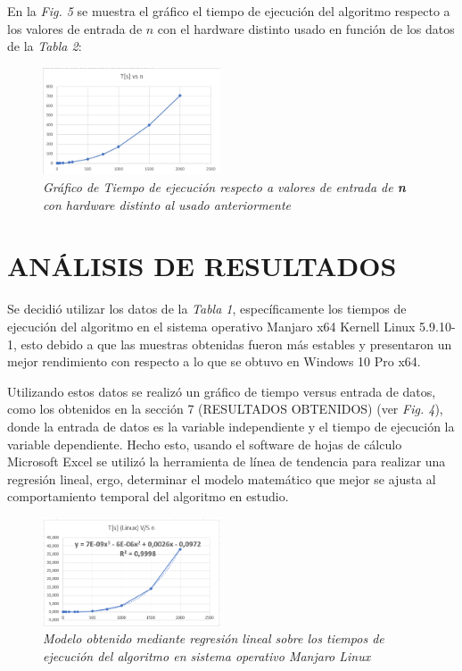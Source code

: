\documentclass[11pt, twocolumn]{llncs}
\begin{document}
En la \textit{Fig. 5} se muestra el gráfico el tiempo de ejecución del algoritmo respecto a los valores de entrada de $n$ con el hardware distinto usado en función de los datos de la \textit{Tabla 2}:

\begin{figure}[H]
\caption{\textit{\label{fig:grafico3}Gráfico de Tiempo de ejecución respecto a valores de entrada de \textbf{n} con hardware distinto al usado anteriormente}}
\centering
\includegraphics[width=0.47\textwidth]{imagenes/grafico_3.jpeg}
\end{figure}

\section{ANÁLISIS DE RESULTADOS}\label{analisis}
Se decidió utilizar los datos de la \textit{Tabla 1}, específicamente los tiempos de ejecución del algoritmo en el sistema operativo Manjaro x64 Kernell Linux 5.9.10-1, esto debido a que las muestras obtenidas fueron más estables y presentaron un mejor rendimiento con respecto a lo que se obtuvo en Windows 10 Pro x64.

Utilizando estos datos se realizó un gráfico de tiempo versus entrada de datos, como los obtenidos en la sección 7 (RESULTADOS OBTENIDOS) (ver \textit{Fig. 4}), donde la entrada de datos es la variable independiente y el tiempo de ejecución la variable dependiente. Hecho esto, usando el software de hojas de cálculo Microsoft Excel se utilizó la herramienta de línea de tendencia para realizar una regresión lineal, ergo, determinar el modelo matemático que mejor se ajusta al comportamiento temporal del algoritmo en estudio.

\begin{figure}[H]
\caption{\textit{\label{fig:grafico4}Modelo obtenido mediante regresión lineal sobre los tiempos de ejecución del algoritmo en sistema operativo Manjaro Linux}}
\centering
\includegraphics[width=0.47\textwidth]{imagenes/grafico_4.png}
\end{figure}
\end{document}
